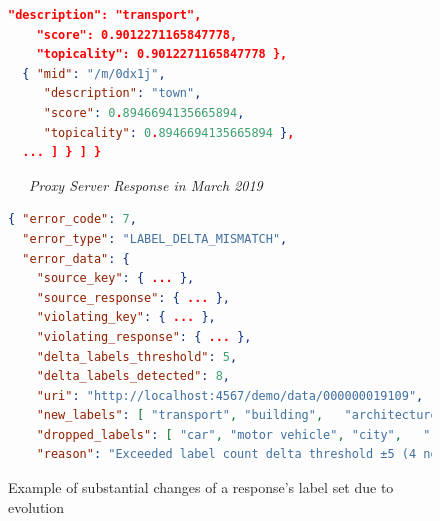 \begin{figure}
\begin{framed}
\begin{minipage}{\linewidth}
\begin{lstlisting}[language=json]
    "description": "transport",
    "score": 0.9012271165847778,
    "topicality": 0.9012271165847778 },
  { "mid": "/m/0dx1j",
     "description": "town",
     "score": 0.8946694135665894,
     "topicality": 0.8946694135665894 },
  ... ] } ] }
        \end{lstlisting}
    \end{minipage}
    \begin{minipage}{\linewidth}
        \centering
        \noindent\xrfill[0.45ex]{.5pt}~~~\textit{Proxy Server Response in March 2019}~~~\xrfill[0.45ex]{.5pt}
        \begin{lstlisting}[language=json]
{ "error_code": 7,
  "error_type": "LABEL_DELTA_MISMATCH",
  "error_data": {
    "source_key": { ... },
    "source_response": { ... },
    "violating_key": { ... },
    "violating_response": { ... },
    "delta_labels_threshold": 5,
    "delta_labels_detected": 8,
    "uri": "http://localhost:4567/demo/data/000000019109",
    "new_labels": [ "transport", "building",   "architecture", "house" ],
    "dropped_labels": [ "car", "motor vehicle", "city",   "road" ],
    "reason": "Exceeded label count delta threshold ±5 (4 new labels + 4 dropped labels = 8)." } }
        \end{lstlisting}
    \end{minipage}
    \end{framed}
    \caption{Example of substantial changes of a response's label set due to evolution}
    \label{fig:example-label-delta}
\end{figure}
